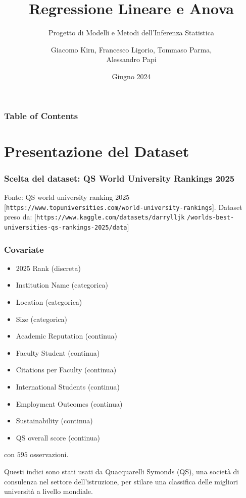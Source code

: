\documentclass{beamer}
\title{Regressione Lineare e Anova}
\subtitle{Progetto di Modelli e Metodi dell'Inferenza Statistica}
\author{Giacomo Kirn, Francesco Ligorio, Tommaso Parma,\\ Alessandro Papi}
\institute{Politecnico di Milano}
\date{Giugno 2024}
\begin{document}
\frame{\titlepage}

\begin{frame}
    \frametitle{Table of Contents}
    \tableofcontents
\end{frame}

\section{Presentazione del Dataset}
\begin{frame}
    \frametitle{Scelta del dataset: QS World University Rankings 2025}
    Fonte: QS world university ranking 2025 [\texttt{https://www.topuniversities.com/world-university-rankings}].
    Dataset preso da:
    [\texttt{https://www.kaggle.com/datasets/darrylljk}
    \texttt{/worlds-best-universities-qs-rankings-2025/data}]
\end{frame}

\begin{frame}
    \frametitle{Covariate}
    \begin{itemize}
        \item 2025 Rank (discreta)
        \item Institution Name (categorica)
        \item Location (categorica)
        \item Size (categorica)
        \item Academic Reputation (continua)
        \item Faculty Student (continua)
        \item Citations per Faculty (continua)
        \item International Students (continua)
        \item Employment Outcomes (continua)
        \item Sustainability (continua)
        \item QS overall score (continua)
    \end{itemize}
    con $595$ osservazioni.
\end{frame}

\begin{frame}
	Questi indici sono stati usati da Quacquarelli Symonds (QS), una società di consulenza nel settore dell'istruzione, per stilare una classifica delle migliori università a livello mondiale.
\end{frame}
\end{document}
